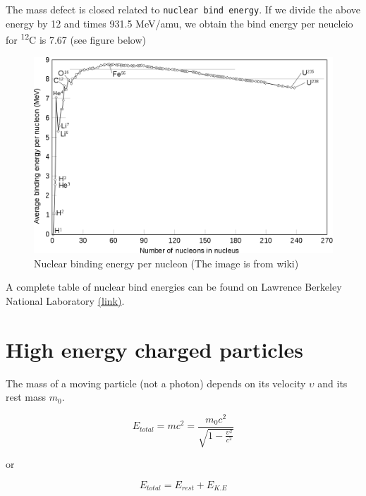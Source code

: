\documentclass[]{book}
\theoremstyle{definition}
\theoremstyle{definition}
\theoremstyle{definition}
\theoremstyle{remark}
\begin{document}
The mass defect is closed related to \texttt{nuclear\ bind\ energy}. If
we divide the above energy by 12 and times 931.5 MeV/amu, we obtain the
bind energy per neucleio for \textsuperscript{12}C is 7.67 (see figure
below)

\begin{figure}

{\centering \includegraphics[width=13.89in]{figures/binding_energy} 

}

\caption{Nuclear binding energy per nucleon (The image is from wiki)}\label{fig:unnamed-chunk-4}
\end{figure}

A complete table of nuclear bind energies can be found on Lawrence
Berkeley National Laboratory
\href{http://xdb.lbl.gov/Section1/Table_1-1.pdf}{(link)}.

\section{High energy charged particles}\label{einstein}

The mass of a moving particle (not a photon) depends on its velocity
\(\upsilon\) and its rest mass \(m_0\).

\begin{equation}
    E_{total} = mc^2 = \frac{m_0c^2}{\sqrt{1-\frac{\upsilon^2}{c^2}}} 
    \label{eq:emc2}
\end{equation}

or

\begin{equation}
    E_{total} = E_{rest}+E_{K.E} 
\end{equation}
\end{document}
